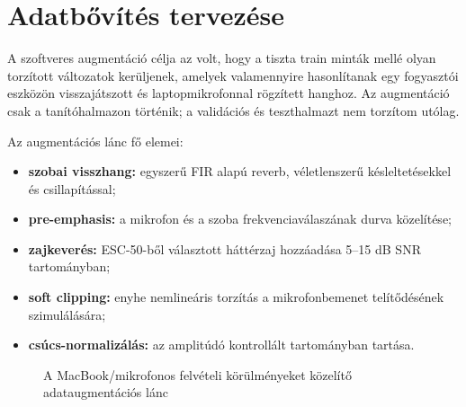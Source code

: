 \section{Adatbővítés tervezése}
\label{sec:augmentation}

A szoftveres augmentáció célja az volt, hogy a tiszta train minták mellé olyan torzított változatok kerüljenek, amelyek valamennyire hasonlítanak egy fogyasztói eszközön visszajátszott és laptopmikrofonnal rögzített hanghoz. Az augmentáció csak a tanítóhalmazon történik; a validációs és teszthalmazt nem torzítom utólag.

Az augmentációs lánc fő elemei:
\begin{itemize}
  \item \textbf{szobai visszhang:} egyszerű FIR alapú reverb, véletlenszerű késleltetésekkel és csillapítással;
  \item \textbf{pre-emphasis:} a mikrofon és a szoba frekvenciaválaszának durva közelítése;
  \item \textbf{zajkeverés:} ESC-50-ből választott háttérzaj hozzáadása 5--15 dB SNR tartományban;
  \item \textbf{soft clipping:} enyhe nemlineáris torzítás a mikrofonbemenet telítődésének szimulálására;
  \item \textbf{csúcs-normalizálás:} az amplitúdó kontrollált tartományban tartása.
\end{itemize}

\begin{figure}[H]
\centering
{}
\caption{A MacBook/mikrofonos felvételi körülményeket közelítő adataugmentációs lánc}
\label{fig:augmentation_chain}
\end{figure}

